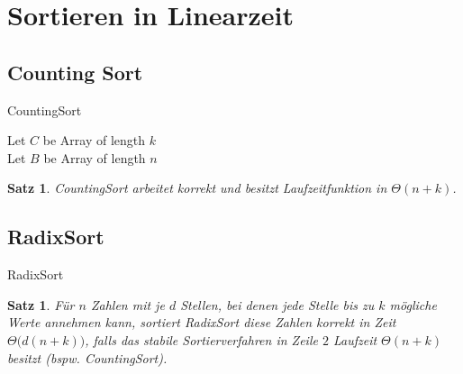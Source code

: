 \documentclass[a4paper,12pt]{article}
\newtheorem{satz}[axiom]{Satz}
\theoremstyle{definition}
\begin{document}
	\setcounter{section}{8}
	\section{Sortieren in Linearzeit}
	\subsection{Counting Sort}
	\begin{algorithm}[h]
		\caption{CountingSort}
		Let $C$ be Array of length $k$\\
		Let $B$ be Array of length $n$
	\end{algorithm}
	\begin{satz}
		CountingSort arbeitet korrekt und besitzt Laufzeitfunktion in $\Theta(n + k)$.
	\end{satz}
	\subsection{RadixSort}
	\begin{algorithm}[h]
		\caption{RadixSort}
	\end{algorithm}
	\begin{satz}
		Für $n$ Zahlen mit je $d$ Stellen, bei denen jede Stelle bis zu $k$ mögliche Werte annehmen kann, sortiert RadixSort diese Zahlen korrekt in Zeit $\Theta\big(d(n + k)\big)$, falls das stabile Sortierverfahren in Zeile $2$ Laufzeit $\Theta(n + k)$ besitzt (bspw. CountingSort).
	\end{satz}
\end{document}
